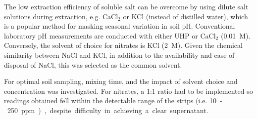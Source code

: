The low extraction efficiency of soluble salt can be overcome by using dilute salt solutions during extraction, e.g. CaCl$_2$ or KCl (instead of distilled water), which is a popular method for masking seasonal variation in soil pH. Conventional laboratory pH measurements are conducted with either \gls{UHP} or CaCl$_2$ (\SI{0.01}{M})\cite{VanLierop1981}. Conversely, the solvent of choice for nitrates is KCl (\SI{2}{M}).\cite{Pare1995} Given the chemical similarity between NaCl and KCl, in addition to the availability and ease of disposal of NaCl, this was selected as the common solvent. 

For optimal soil sampling, mixing time, and the impact of solvent choice and concentration was investigated. For nitrates, a 1:1 ratio had to be implemented so readings obtained fell within the detectable range of the strips (i.e. \SI{10}-\SI{250}{ppm}), despite difficulty in achieving a clear supernatant.







